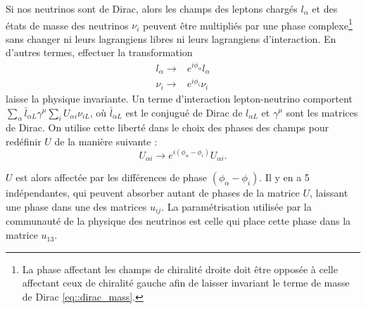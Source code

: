             Si nos neutrinos sont de Dirac, alors les champs des leptons chargés $l_{\alpha}$ et des états de masse des neutrinos $\nu_i$ peuvent être multipliés par une phase complexe\footnote{La phase affectant les champs de chiralité droite doit être opposée à celle affectant ceux de chiralité gauche afin de laisser invariant le terme de masse de Dirac \eqref{eq::dirac_mass}.} sans changer ni leurs lagrangiens libres ni leurs lagrangiens d'interaction. En d'autres termes, effectuer la transformation 
            \begin{eqnarray}
                l_{\alpha}\to & e^{i\phi_{\alpha}}l_{\alpha} \\
                \nu_i\to & e^{i\phi_i}\nu_i 
            \end{eqnarray}
            laisse la physique invariante. Un terme d'interaction lepton-neutrino comportent $\sum_{\alpha}\bar{l}_{\alpha L}\gamma^{\mu}\sum_i U_{\alpha i}\nu_{i L}$, où $\bar{l}_{\alpha L}$ est le conjugué de Dirac de $l_{\alpha L}$ et $\gamma^{\mu}$ sont les matrices de Dirac. On utilise cette liberté dans le choix des phases des champs pour redéfinir $U$ de la manière suivante :
            \begin{equation}
                U_{\alpha i}\to e^{i(\phi_{\alpha}-\phi_i)}U_{\alpha i}.
            \end{equation}
            
            $U$ est alors affectée par les différences de phase $(\phi_{\alpha}-\phi_i)$. Il y en a 5 indépendantes, qui peuvent absorber autant de phases de la matrice $U$, laissant une phase dans une des matrices $u_{ij}$. La paramétrisation utilisée par la communauté de la physique des neutrinos est celle qui place cette phase dans la matrice $u_{13}$.
            
